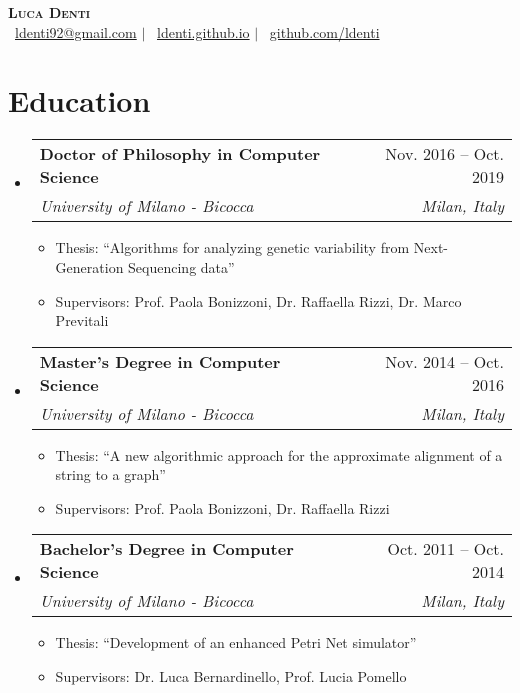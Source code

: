 \documentclass[letterpaper,11pt]{article}
\makeatletter
\newcommand{\resumeItem}[1]{
  \item\small{
    {#1 \vspace{-2pt}}
  }
}
\newcommand{\resumeSubheading}[4]{
  \vspace{-2pt}\item
    \begin{tabular*}{0.97\textwidth}[t]{l@{\extracolsep{\fill}}r}
      \textbf{#1} & #2 \\
      \textit{\small#3} & \textit{\small #4} \\
    \end{tabular*}\vspace{-7pt}
}
\newcommand{\resumeSubHeadingListStart}{\begin{itemize}[leftmargin=0.15in, label={}]}
\newcommand{\resumeSubHeadingListEnd}{\end{itemize}}
\newcommand{\resumeItemListStart}{\begin{itemize}}
\newcommand{\resumeItemListEnd}{\end{itemize}\vspace{-5pt}}
\makeatother
\begin{document}

\begin{center}
    \textbf{\Huge \scshape Luca Denti} \\ \vspace{1pt}
    \Letter~\href{mailto:ldenti92@gmail.com}{ldenti92@gmail.com} $|$
    \faHome~\href{https://ldenti.github.io}{ldenti.github.io} $|$
    \faGithub~\href{https://github.com/ldenti}{github.com/ldenti}
\end{center}


\section{Education}
  \resumeSubHeadingListStart
    \resumeSubheading
      {Doctor of Philosophy in Computer Science}{Nov. 2016 -- Oct. 2019}
      {University of Milano - Bicocca}{Milan, Italy}
      \resumeItemListStart
      \resumeItem{Thesis: ``Algorithms for analyzing genetic variability from Next-Generation Sequencing data''}
      \resumeItem{Supervisors: Prof. Paola Bonizzoni, Dr. Raffaella Rizzi, Dr. Marco Previtali}
      \resumeItemListEnd
    \resumeSubheading
      {Master's Degree in Computer Science}{Nov. 2014 -- Oct. 2016}
      {University of Milano - Bicocca}{Milan, Italy}
      \resumeItemListStart
      \resumeItem{Thesis: ``A new algorithmic approach for the approximate alignment of a string to a graph''}
      \resumeItem{Supervisors: Prof. Paola Bonizzoni, Dr. Raffaella Rizzi}
      \resumeItemListEnd
    \resumeSubheading
      {Bachelor's Degree in Computer Science}{Oct. 2011 -- Oct. 2014}
      {University of Milano - Bicocca}{Milan, Italy}
      \resumeItemListStart
      \resumeItem{Thesis: ``Development of an enhanced Petri Net simulator''}
      \resumeItem{Supervisors: Dr. Luca Bernardinello, Prof. Lucia Pomello}
      \resumeItemListEnd
  \resumeSubHeadingListEnd
\end{document}
